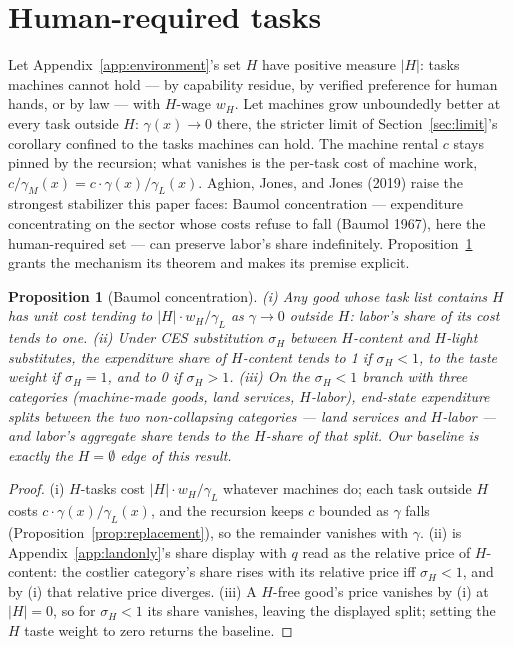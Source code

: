 \documentclass[12pt]{article}
\theoremstyle{plain}
\newtheorem{proposition}{Proposition}
\begin{document}
\section{Human-required tasks}\label{app:human}

Let Appendix~\ref{app:environment}'s set $H$ have positive measure $|H|$: tasks machines cannot hold --- by capability residue, by verified preference for human hands, or by law --- with $H$-wage $w_H$. Let machines grow unboundedly better at every task outside $H$: $\gamma (x) \to 0$ there, the stricter limit of Section~\ref{sec:limit}'s corollary confined to the tasks machines can hold. The machine rental $c$ stays pinned by the recursion; what vanishes is the per-task cost of machine work, $c/\gamma _M(x) = c\cdot \gamma (x)/\gamma _L(x)$. Aghion, Jones, and Jones (2019) raise the strongest stabilizer this paper faces: Baumol concentration --- expenditure concentrating on the sector whose costs refuse to fall (Baumol 1967), here the human-required set --- can preserve labor's share indefinitely. Proposition~\ref{prop:baumol} grants the mechanism its theorem and makes its premise explicit.

\begin{proposition}[Baumol concentration]\label{prop:baumol}
(i) Any good whose task list contains $H$ has unit cost tending to $|H|\cdot w_H/\gamma _L$ as $\gamma \to 0$ outside $H$: labor's share of its cost tends to one. (ii) Under CES substitution $\sigma _H$ between $H$-content and $H$-light substitutes, the expenditure share of $H$-content tends to 1 if $\sigma _H < 1$, to the taste weight if $\sigma _H = 1$, and to 0 if $\sigma _H > 1$. (iii) On the $\sigma _H < 1$ branch with three categories (machine-made goods, land services, $H$-labor), end-state expenditure splits between the two non-collapsing categories --- land services and $H$-labor --- and labor's aggregate share tends to the $H$-share of that split. Our baseline is exactly the $H = \emptyset$ edge of this result.
\end{proposition}

\begin{proof}
(i) $H$-tasks cost $|H|\cdot w_H/\gamma _L$ whatever machines do; each task outside $H$ costs $c\cdot \gamma (x)/\gamma _L(x)$, and the recursion keeps $c$ bounded as $\gamma$ falls (Proposition~\ref{prop:replacement}), so the remainder vanishes with $\gamma$. (ii) is Appendix~\ref{app:landonly}'s share display with $q$ read as the relative price of $H$-content: the costlier category's share rises with its relative price iff $\sigma _H < 1$, and by (i) that relative price diverges. (iii) A $H$-free good's price vanishes by (i) at $|H| = 0$, so for $\sigma _H < 1$ its share vanishes, leaving the displayed split; setting the $H$ taste weight to zero returns the baseline.
\end{proof}
\end{document}

